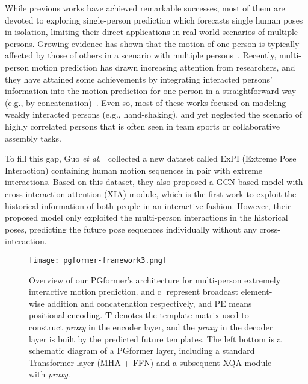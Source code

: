 \documentclass[10pt,twocolumn,letterpaper]{article}
\begin{document}
While previous works have achieved remarkable successes, most of them are devoted to exploring single-person prediction which forecasts single human poses in isolation, limiting their direct applications in real-world scenarios of multiple persons. 
Growing evidence has shown that the motion of one person is typically affected by those of others in a scenario with multiple persons~\cite{wang2021multiperson}. 
Recently, multi-person motion prediction has drawn increasing attention from researchers, 
and they have attained some achievements by integrating interacted persons' information into the motion prediction for one person in a straightforward way (e.g., by concatenation)~\cite{wang2021multiperson, Vendrow2022SoMoFormer, Adeli2021TRiPOD}.
Even so, most of these works focused on modeling weakly interacted persons (e.g., hand-shaking), and yet neglected the scenario of highly correlated persons that is often seen in team sports or collaborative assembly tasks. 


To fill this gap, 
Guo \textit{et al.}~\cite{guo2021multi} collected a new dataset called ExPI (Extreme Pose Interaction) containing human motion sequences in pair with extreme interactions. 
Based on this dataset, they also proposed a GCN-based model with cross-interaction attention (XIA) module, which is the first work to exploit the historical information of both people in an interactive fashion. 
However, their proposed model only exploited the multi-person interactions in the historical poses, predicting the future pose sequences individually without any cross-interaction.


\begin{figure*}[ht]
    \vskip -0.1in
	\begin{center}
		\centerline{\texttt{[image: pgformer-framework3.png]}} \caption{Overview of our PGformer's architecture for multi-person extremely interactive motion prediction.  and \textcircled{c} represent broadcast element-wise addition and concatenation respectively, and PE means positional encoding. \textbf{T} denotes the template matrix used to construct \textit{proxy} in the encoder layer, and the \textit{proxy} in the decoder layer is built by the predicted future templates. The left bottom is a schematic diagram of a PGformer layer, including a standard Transformer layer (MHA + FFN) and a subsequent XQA module with \textit{proxy}. 
        }
		\label{fig:framework}
	\end{center}
  \vskip -0.4in
\end{figure*}
\end{document}
